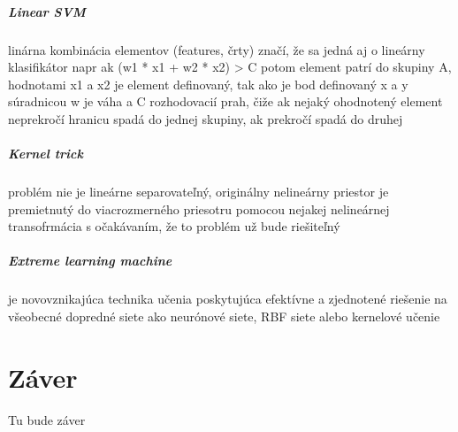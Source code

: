 \documentclass[12pt,oneside,slovak,a4paper]{book}
\begin{document}
\paragraph{Linear SVM}
linárna kombinácia elementov (features, črty) značí, že sa jedná aj o lineárny klasifikátor  %
napr ak (w1 * x1 + w2 * x2) > C potom element patrí do skupiny A, hodnotami x1 a x2 je element definovaný, tak ako je bod definovaný x a y súradnicou
w je váha a C rozhodovacií prah, čiže ak nejaký ohodnotený element neprekročí hranicu spadá do jednej skupiny, ak prekročí spadá do druhej

\paragraph{Kernel trick}
problém nie je lineárne separovateľný, originálny nelineárny priestor %
je premietnutý do viacrozmerného priesotru pomocou nejakej nelineárnej transofrmácia s očakávaním, že to problém už bude riešiteľný

\paragraph{Extreme learning machine}
je novovznikajúca technika učenia poskytujúca efektívne %
a zjednotené riešenie na všeobecné dopredné siete ako
neurónové siete, RBF siete alebo kernelové učenie


\chapter{Záver} \label{zaver}
Tu bude záver




\end{document}
